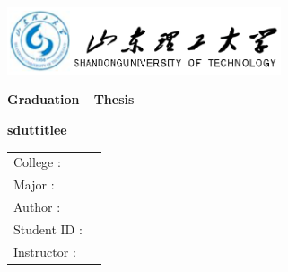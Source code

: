 {
  \setlength{\parindent}{0em}

  {
    \linespread{1}
    \begin{flushleft}
      \includegraphics[height=19.8mm]{data/cover-zh/logo.eps}
    \end{flushleft}

    \vspace{2em}
    
    {
      \heiti\sishiwu\bfseries
      \centering
      Graduation~~Thesis \par
    }
    \vspace{6em}
    
    {
      \heiti\erhao\bfseries
      \centering
      {sduttitlee} \par
    }
    
  }

 

  \vspace{12em}

  {
    \linespread{2}
    \begin{center}
    \sanhao
    \newlength{\majorlength}
    \setlength{\majorlength}{16em}
    \begin{tabular}{l l}
    College : \underline{\makebox[\majorlength]{\sdutschoole}} \\
    Major : \underline{\makebox[\majorlength]{\sdutmajore}} \\
    Author : \underline{\makebox[\majorlength]{\sdutstudentnamee}} \\
    Student ID : \underline{\makebox[\majorlength]{\sdutstudentide}} \\
    Instructor : \underline{\makebox[\majorlength]{\instructore}} \\
    \end{tabular} \par
    \end{center}
  }
  \vfill
  {
    \songti\sihao\bfseries
      \centering
      \sdutdatee \par
  }
}

